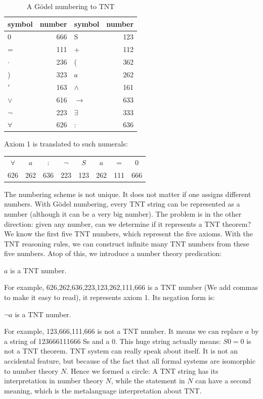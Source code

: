 \documentclass{article}
\begin{document}
\begin{table}[htbp]
\centering
\begin{tabular}{|l|r||l|r|}
\hline
\textbf{symbol} & \textbf{number} & \textbf{symbol} & \textbf{number} \\
\hline
0 & 666 & S & 123 \\
\hline
= & 111 & + & 112 \\
\hline
$\cdot$ & 236 & ( & 362 \\
\hline
) & 323 & $a$ & 262 \\
\hline
$'$ & 163 & $\land$ & 161 \\
\hline
$\lor$ & 616 & $\to$ & 633 \\
\hline
$\lnot$ & 223 & $\exists$ & 333 \\
\hline
$\forall$ & 626 & : & 636 \\
\hline
\end{tabular}
\caption{A Gödel numbering to TNT}
\end{table}

Axiom 1 is translated to such numerals:

\begin{tabular}{cccccccc}
$\forall$ & $a$ & : & $\lnot$ & $S$ & $a$ & = & 0 \\
626 & 262 & 636 & 223 & 123 & 262 & 111 & 666 \\
\end{tabular}

The numbering scheme is not unique. It does not matter if one assigns different numbers. With Gödel numbering, every TNT string can be represented as a number (although it can be a very big number). The problem is in the other direction: given any number, can we determine if it represents a TNT theorem? We know the first five TNT numbers, which represent the five axioms. With the TNT reasoning rules, we can construct infinite many TNT numbers from these five numbers. Atop of this, we introduce a number theory predication:

\begin{center}
$a$ is a TNT number.
\end{center}

For example, 626,262,636,223,123,262,111,666 is a TNT number (We add commas to make it easy to read), it represents axiom 1. Its negation form is:

\begin{center}
$\lnot a$ is a TNT number.
\end{center}

For example, 123,666,111,666 is not a TNT number. It means we can replace $a$ by a string of 123666111666 Ss and a 0. This huge string actually means: $S0 = 0$ is not a TNT theorem. TNT system can really speak about itself. It is not an accidental feature, but because of the fact that all formal systems are isomorphic to number theory $N$. Hence we formed a circle: A TNT string has its interpretation in number theory $N$, while the statement in $N$ can have a second meaning, which is the metalanguage interpretation about TNT.
\end{document}
